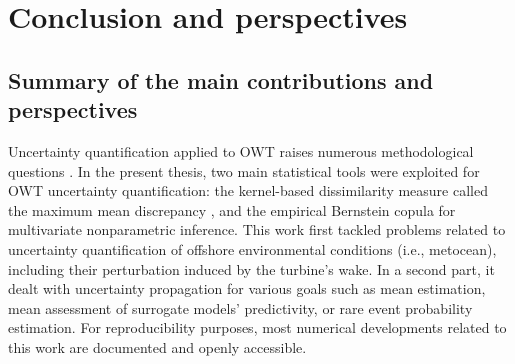 \chapter*{Conclusion and perspectives}


\section*{Summary of the main contributions and perspectives}
Uncertainty quantification applied to OWT raises numerous methodological questions \citep{veers_2019_review}. 
In the present thesis, two main statistical tools were exploited for OWT uncertainty quantification: the kernel-based dissimilarity measure called the maximum mean discrepancy \citep{gretton_2006}, and the empirical Bernstein copula \citep{sancetta_satchell_2004} for multivariate nonparametric inference. 
This work first tackled problems related to uncertainty quantification of offshore environmental conditions (i.e., metocean), including their perturbation induced by the turbine's wake. 
In a second part, it dealt with uncertainty propagation for various goals such as mean estimation, mean assessment of surrogate models' predictivity, or rare event probability estimation.
For reproducibility purposes, most numerical developments related to this work are documented and openly accessible. 


